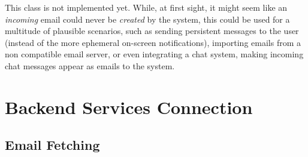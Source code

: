 \lipsum[1]

\subsubsection{}

This class is not implemented yet. While, at first sight, it might seem like an \emph{incoming} email could never be \emph{created} by the system, this could be used for a multitude of plausible scenarios, such as sending persistent messages to the user (instead of the more ephemeral on-screen notifications), importing emails from a non  compatible email server, or even integrating a chat system, making incoming chat messages appear as emails to the system.

\subsection{}

\lipsum[1]

\subsection{}

\lipsum[1]

\subsection{}

\lipsum[1]

\subsection{}

\lipsum[1]

\subsection{}

\lipsum[1]


\section{Backend Services Connection}

\lipsum[1]

\subsection{Email Fetching}

